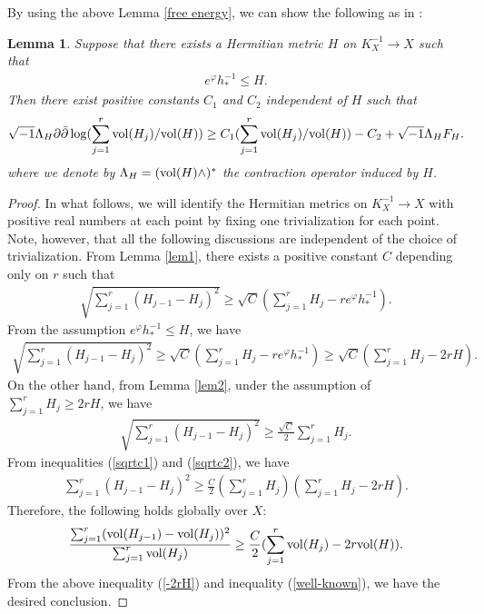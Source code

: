 \documentclass[12pt]{article}
\theoremstyle{definition}
\newtheorem{lemm}[defi]{Lemma}
\def\refe{\ast}
\def\vol{{\rm vol}}
\def\inum{{\sqrt{-1}}}
\begin{document}
By using the above Lemma \ref{free energy}, we can show the following as in \cite[Lemma 3.13]{LM1}:
\begin{lemm}\label{ephi}{\it Suppose that there exists a Hermitian metric $H$ on $K_X^{-1}\rightarrow X$ such that
\begin{align*}
e^{\varphi}h_\refe^{-1}\leq H.
\end{align*}
Then there exist positive constants $C_1$ and $C_2$ independent of $H$ such that
\begin{align}
\inum\Lambda_H\partial\bar{\partial}\log(\sum_{j=1}^r\vol(H_j)/\vol(H))\geq C_1(\sum_{j=1}^r\vol(H_j)/\vol(H))-C_2+\inum \Lambda_HF_H. \label{C1C2}
\end{align}
where we denote by $\Lambda_H=(\vol(H)\wedge)^{\ast}$ the contraction operator induced by $H$.
}
\end{lemm}
\begin{proof} In what follows, we will identify the Hermitian metrics on $K_X^{-1}\rightarrow X$ with positive real numbers at each point by fixing one trivialization for each point. Note, however, that all the following discussions are independent of the choice of trivialization. From Lemma \ref{lem1}, there exists a positive constant $C$ depending only on $r$ such that
\begin{align*}
\sqrt{\sum_{j=1}^r(H_{j-1}-H_j)^2}\geq \sqrt{C}(\sum_{j=1}^rH_j-re^{\varphi}h_\refe^{-1}).
\end{align*}
From the assumption $e^\varphi h_\refe^{-1}\leq H$, we have
\begin{align}
\sqrt{\sum_{j=1}^r(H_{j-1}-H_j)^2}\geq \sqrt{C}(\sum_{j=1}^rH_j-re^{\varphi}h_\refe^{-1})\geq \sqrt{C}(\sum_{j=1}^rH_j-2r H). \label{sqrtc1}
\end{align}
On the other hand, from Lemma \ref{lem2}, under the assumption of $\sum_{j=1}^rH_j\geq 2rH$, we have
\begin{align}
\sqrt{\sum_{j=1}^r(H_{j-1}-H_j)^2}\geq \frac{\sqrt{C}}{2}\sum_{j=1}^rH_j. \label{sqrtc2}
\end{align}
From inequalities (\ref{sqrtc1}) and (\ref{sqrtc2}), we have
\begin{align}
\sum_{j=1}^r(H_{j-1}-H_j)^2\geq \frac{C}{2}(\sum_{j=1}^rH_j)(\sum_{j=1}^rH_j-2rH).
\end{align}
Therefore, the following holds globally over $X$:
\begin{align}
\frac{\sum_{j=1}^r(\vol(H_{j-1})-\vol(H_j))^2}{\sum_{j=1}^r\vol(H_j)}\geq \frac{C}{2}(\sum_{j=1}^r\vol(H_j)-2r\vol(H)). \label{-2rH}
\end{align}
From the above inequality (\ref{-2rH}) and inequality (\ref{well-known}), we have the desired conclusion.
\end{proof}
\end{document}
